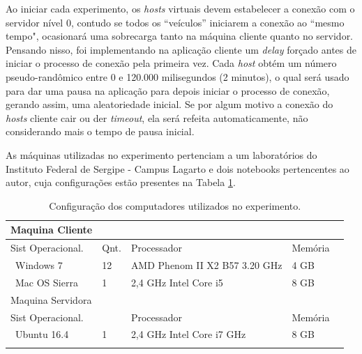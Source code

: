 \documentclass[
	12pt,				%
	oneside,			%
	a4paper,			%
	english,			%
	brazil				%
	]{abntex2ppgsi}
\begin{document}
Ao iniciar cada experimento, os \textit{hosts} virtuais devem estabelecer a conexão com o servidor nível 0, contudo se todos os ``veículos''  iniciarem a conexão ao ``mesmo tempo", ocasionará uma sobrecarga tanto na máquina cliente quanto no servidor. Pensando nisso, foi implementando na aplicação cliente um \textit{delay} forçado antes de iniciar o processo de conexão pela primeira vez. Cada \textit{host} obtém um número pseudo-randômico entre 0 e 120.000 milisegundos (2 minutos), o qual será usado para dar uma pausa na aplicação para depois iniciar o processo de conexão, gerando assim, uma aleatoriedade inicial. Se por algum motivo a conexão do \textit{hosts} cliente cair ou der \textit{timeout}, ela será refeita automaticamente, não considerando mais o tempo de pausa inicial. 



As máquinas utilizadas no experimento pertenciam a um laboratórios do Instituto Federal de Sergipe - Campus Lagarto e dois notebooks pertencentes ao autor, cuja configurações estão presentes na Tabela \ref{tab:configuracaoMaquinas}.


\begin{longtable}{ |p{} |p{}  |p{}   |p{} | p{}} 
	\hline
	\rowcolor[gray]{0.7}
	 Maquina Cliente &	& 	&  \\ \hline
	\rowcolor[gray]{0.7}
	Sist Operacional.	& Qnt. & Processador	& Memória \\ \
	Windows 7	& 12 & AMD Phenom II X2 B57 3.20 GHz & 4 GB	\\ \
	Mac OS Sierra	& 1 & 2,4 GHz Intel Core i5	& 8 GB \\   \hline
	\rowcolor[gray]{0.7}
	 Maquina Servidora &	& 	&  \\ \hline
	\rowcolor[gray]{0.7}
	 Sist Operacional. &	& Processador	& Memória \\ \
	Ubuntu 16.4	& 1 & 2,4 GHz Intel Core i7 GHz & 8 GB	\\ \hline
	\caption{Configuração dos computadores utilizados no experimento. } 
	\label{tab:configuracaoMaquinas}
\end{longtable}
\end{document}
